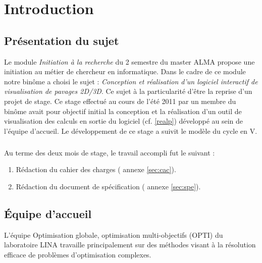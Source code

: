\chapter{Introduction}

\section{Présentation du sujet}
Le module \emph{Initiation à la recherche} du 2 semestre du master \textsc{ALMA} propose une initiation au métier de chercheur en informatique. Dans le cadre de ce module notre binôme a choisi le sujet : \emph{Conception et réalisation d’un logiciel interactif de visualisation de pavages 2D/3D}. Ce sujet à la particularité d'être la reprise d'un projet de stage. Ce stage effectué au cours de l'été 2011 par un membre du binôme avait pour objectif initial la conception et la réalisation d'un outil de visualisation des calculs en sortie du logiciel \realpaver (cf. \ref{realp}) développé au sein de l'équipe d'accueil. Le développement de ce stage a suivit le modèle du cycle en V.

\paragraph{}
Au terme des deux mois de stage, le travail accompli fut le suivant :
\begin{enumerate}
\item 
Rédaction du cahier des charges (\cf{} annexe \ref{sec:cac}).
\item
Rédaction du document de spécification (\cf{} annexe \ref{sec:spe}).
\end{enumerate} 



\section{\'Equipe d'accueil}
L'équipe Optimisation globale, optimisation multi-objectifs\cite{opti} (\textsc{OPTI}) du laboratoire \textsc{LINA}\cite{lina} travaille principalement sur des méthodes visant à la résolution efficace de problèmes d’optimisation complexes.  

